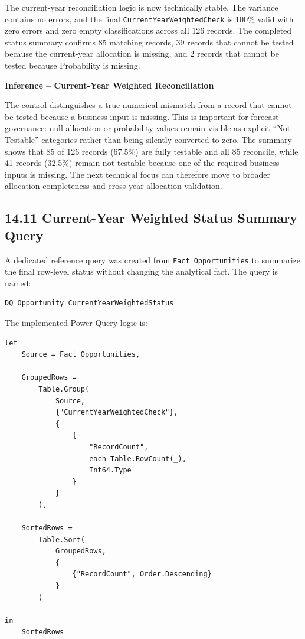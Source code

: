 \documentclass[11pt,a4paper]{article}
\begin{document}
\begin{successbox}

\textbf{\color{SuccessGreen}{Current-Year Weighted Control Result}}

The current-year reconciliation logic is now technically stable. The variance
contains no errors, and the final \texttt{CurrentYearWeightedCheck} is
100\% valid with zero errors and zero empty classifications across all
126 records. The completed status summary confirms 85 matching records,
39 records that cannot be tested because the current-year allocation is
missing, and 2 records that cannot be tested because Probability is missing.

\end{successbox}

\begin{inferencebox}

\textbf{Inference -- Current-Year Weighted Reconciliation}

The control distinguishes a true numerical mismatch from a record that cannot be
tested because a business input is missing. This is important for forecast
governance: null allocation or probability values remain visible as explicit
``Not Testable'' categories rather than being silently converted to zero.
The summary shows that 85 of 126 records (67.5\%) are fully testable and all
85 reconcile, while 41 records (32.5\%) remain not testable because one of the
required business inputs is missing. The next technical focus can therefore
move to broader allocation completeness and cross-year allocation validation.

\end{inferencebox}

\subsection{14.11 Current-Year Weighted Status Summary Query}

A dedicated reference query was created from \texttt{Fact\_Opportunities} to
summarize the final row-level status without changing the analytical fact. The
query is named:

\begin{lstlisting}[style=powerquery]
DQ_Opportunity_CurrentYearWeightedStatus
\end{lstlisting}

The implemented Power Query logic is:

\begin{lstlisting}[style=powerquery]
let
    Source = Fact_Opportunities,

    GroupedRows =
        Table.Group(
            Source,
            {"CurrentYearWeightedCheck"},
            {
                {
                    "RecordCount",
                    each Table.RowCount(_),
                    Int64.Type
                }
            }
        ),

    SortedRows =
        Table.Sort(
            GroupedRows,
            {
                {"RecordCount", Order.Descending}
            }
        )

in
    SortedRows
\end{lstlisting}
\end{document}
